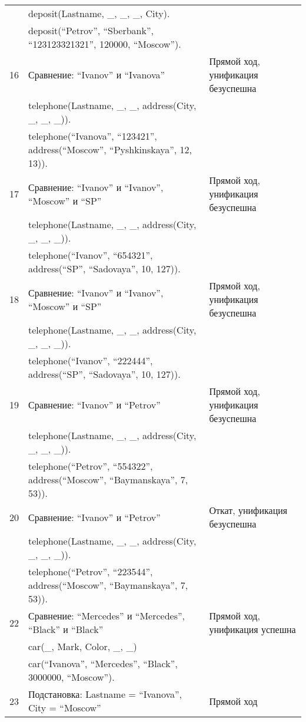 {\begin{longtable}{|p{1.15cm}|p{8cm}|p{8cm}|}
       & deposit(Lastname, \_, \_, \_, City). & \\
       & deposit(``Petrov'', ``Sberbank'', ``123123321321'', 120000, ``Moscow''). & \\
    \hline
    16 & Сравнение: ``Ivanov'' и ``Ivanova'' & Прямой ход, унификация безуспешна \\
      & telephone(Lastname, \_, \_, address(City, \_, \_, \_)). & \\
      & telephone(``Ivanova'', ``123421'', address(``Moscow'', ``Pyshkinskaya'', 12, 13)). & \\
    \hline
    17 & Сравнение: ``Ivanov'' и ``Ivanov'', ``Moscow'' и ``SP'' & Прямой ход, унификация безуспешна \\
      & telephone(Lastname, \_, \_, address(City, \_, \_, \_)). & \\
      & telephone(``Ivanov'', ``654321'', address(``SP'', ``Sadovaya'', 10, 127)). & \\
    \hline
    18 & Сравнение: ``Ivanov'' и ``Ivanov'', ``Moscow'' и ``SP'' & Прямой ход, унификация безуспешна \\
      & telephone(Lastname, \_, \_, address(City, \_, \_, \_)). & \\
      & telephone(``Ivanov'', ``222444'', address(``SP'', ``Sadovaya'', 10, 127)). & \\
    \hline
    19 & Сравнение: ``Ivanov'' и ``Petrov'' & Прямой ход, унификация безуспешна \\
      & telephone(Lastname, \_, \_, address(City, \_, \_, \_)). & \\
      & telephone(``Petrov'', ``554322'', address(``Moscow'', ``Baymanskaya'', 7, 53)). & \\
    \hline
    20 & Сравнение: ``Ivanov'' и ``Petrov'' & Откат, унификация безуспешна \\
      & telephone(Lastname, \_, \_, address(City, \_, \_, \_)). & \\
      & telephone(``Petrov'', ``223544'', address(``Moscow'', ``Baymanskaya'', 7, 53)). & \\
    \hline
    22 & Сравнение: ``Mercedes'' и ``Mercedes'', ``Black'' и ``Black'' & Прямой ход, унификация успешна \\
       & car(\_, Mark, Color, \_, \_) & \\
       & car(``Ivanova'', ``Mercedes'', ``Black'', 3000000, ``Moscow''). & \\
    \hline
    23 & Подстановка: Lastname = ``Ivanova'', City = ``Moscow'' & Прямой ход \\

\end{longtable}}
